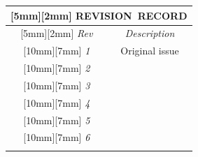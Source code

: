 \documentclass{sebase}
\begin{document}
\begin{tabular}{||p{0.8cm}|p{13.5cm}||}
\hline\hline
\multicolumn{2}{||c||}{%
\raisebox{0pt}[5mm][2mm]{}%
REVISION\ RECORD} \\ \hline
\multicolumn{1}{||c|}{%
\raisebox{0pt}[5mm][2mm]{}%
\emph{Rev}} & \multicolumn{1}{|c||}{\emph{Description}} \\ \hline
\multicolumn{1}{||c|}{%
\raisebox{0pt}[10mm][7mm]{}%
\emph{1}} & \multicolumn{1}{|c||}{%
\parbox{13cm}{Original issue}%
} \\ \hline
\multicolumn{1}{||c|}{%
\raisebox{0pt}[10mm][7mm]{}%
\emph{2}} & \multicolumn{1}{|c||}{%
\parbox{13cm}{}%
} \\ \hline
\multicolumn{1}{||c|}{%
\raisebox{0pt}[10mm][7mm]{}%
\emph{3}} & \multicolumn{1}{|c||}{%
\parbox{13cm}{}%
} \\ \hline
\multicolumn{1}{||c|}{%
\raisebox{0pt}[10mm][7mm]{}%
\emph{4}} & \multicolumn{1}{|c||}{%
\parbox{13cm}{}%
} \\ \hline
\multicolumn{1}{||c|}{%
\raisebox{0pt}[10mm][7mm]{}%
\emph{5}} & \multicolumn{1}{|c||}{%
\parbox{13cm}{}%
} \\ \hline
\multicolumn{1}{||c|}{%
\raisebox{0pt}[10mm][7mm]{}%
\emph{6}} & \multicolumn{1}{|c||}{%
\parbox{13cm}{}%
} \\ \hline
\multicolumn{1}{||c|}{%
}
\end{tabular}
\end{document}
